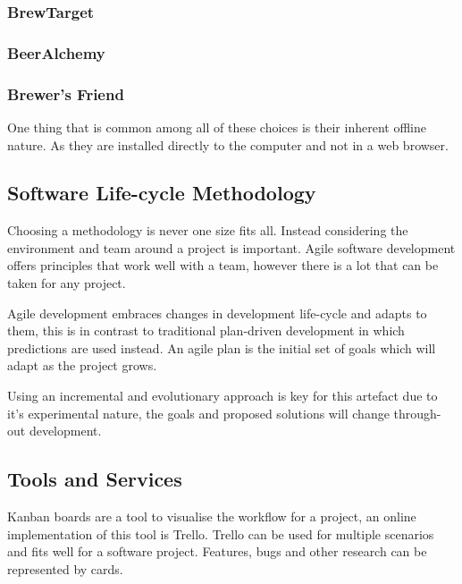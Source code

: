 \subsubsection{BrewTarget}
\subsubsection{BeerAlchemy}
\subsubsection{Brewer's Friend}


One thing that is common among all of these choices is their inherent offline nature. As they are installed directly to the computer and not in a web browser.

\subsection{Software Life-cycle Methodology} \label{a-d--methodology--life-cycle}

Choosing a methodology is never one size fits all. Instead considering the environment and team around a project is important. Agile software development offers principles that work well with a team, however there is a lot that can be taken for any project.

Agile development embraces changes in development life-cycle and adapts to them, this is in contrast to traditional plan-driven development in which predictions are used instead. An agile plan is the initial set of goals which will adapt as the project grows. \cite{fowler_agile}

Using an incremental and evolutionary approach is key for this artefact due to it's experimental nature, the goals and proposed solutions will change through-out development.

\subsection{Tools and Services} \label{a-d--methodology--tools}

Kanban boards are a tool to visualise the workflow for a project, an online implementation of this tool is Trello. Trello can be used for multiple scenarios and fits well for a software project. Features, bugs and other research can be represented by cards. \cite{trello} %

